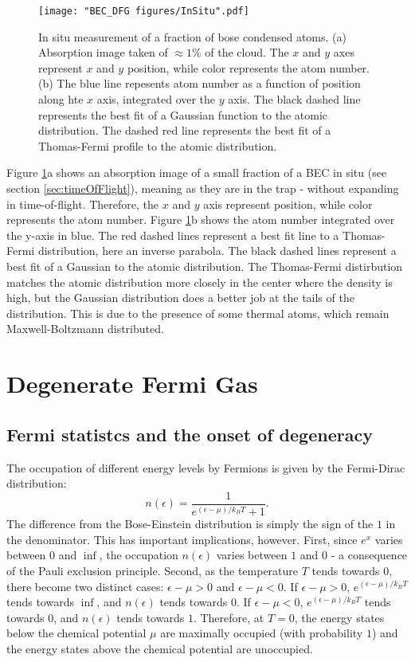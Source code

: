 \begin{figure}
	\texttt{[image: "BEC\_DFG figures/InSitu".pdf]}
\caption[In situ measurement of a fraction of bose condensed atoms]{In situ measurement of a fraction of bose condensed atoms. (a) Absorption image taken of $\approx1\%$ of the cloud. The $x$ and $y$ axes represent $x$ and $y$ position, while color represents the atom number. (b) The blue line repesents atom number as a function of position along hte $x$ axis, integrated over the $y$ axis. The black dashed line represents the best fit of a Gaussian function to the atomic distribution. The dashed red line represents the best fit of a Thomas-Fermi profile to the atomic distribution.}
\label{fig:InSitu}
\end{figure}

Figure \ref{fig:InSitu}a shows an absorption image of a small fraction of a BEC in situ (see section \ref{sec:timeOfFlight}), meaning as they are in the trap - without expanding in time-of-flight. Therefore, the $x$ and $y$ axis represent position, while color represents the atom number. Figure \ref{fig:InSitu}b shows the atom number integrated over the y-axis in blue. The red dashed lines represent a best fit line to a Thomas-Fermi distribution, here an inverse parabola. The black dashed lines represent a best fit of a Gaussian to the atomic distribution. The Thomas-Fermi distirbution matches the atomic distribution more closely in the center where the density is high, but the Gaussian distribution does a better job at the tails of the distribution. This is due to the presence of some thermal atoms, which remain Maxwell-Boltzmann distributed. 


\section{Degenerate Fermi Gas}
\subsection{Fermi statistcs and the onset of degeneracy}
The occupation of different energy levels by Fermions is given by the Fermi-Dirac distribution:
\begin{equation}
n(\epsilon)= \frac{1}{e^{(\epsilon-\mu)/k_BT}+1}.
\end{equation}
The difference from the Bose-Einstein distribution is simply the sign of the $1$ in the denominator. This has important implications, however. First, since $e^x$ varies between $0$ and $\inf$, the occupation $n(\epsilon)$ varies between $1$ and $0$ - a consequence of the Pauli exclusion principle. Second, as the temperature $T$ tends towards $0$, there become two distinct cases: $\epsilon-\mu>0$ and $\epsilon-\mu<0$. If $\epsilon-\mu>0$, $e^{(\epsilon-\mu)/k_BT}$ tends towards $\inf$, and $n(\epsilon)$ tends towards $0$. If  $\epsilon-\mu<0$, $e^{(\epsilon-\mu)/k_BT}$ tends towards $0$, and $n(\epsilon)$ tends towards $1$. Therefore, at $T=0$, the energy states below the chemical potential $\mu$ are maximally occupied (with probability $1$) and the energy states above the chemical potential are unoccupied. 

